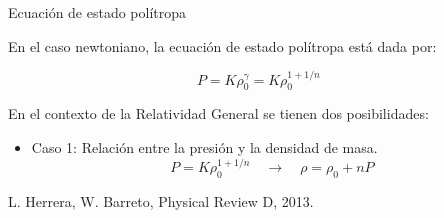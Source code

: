 \documentclass[handout,t]{beamer}
\begin{document}





    





    


\begin{frame}{Ecuación de estado polítropa}

\justifying

En el caso newtoniano, la ecuación de estado polítropa está dada por:    

\begin{equation*}
\label{Poli1}
    P = K \rho_{0}^{\gamma} = K \rho_{0}^{1+1/n} \, 
\end{equation*}    

\vspace{4mm}

En el contexto de la Relatividad General se tienen dos posibilidades:

\vspace{4mm}

\begin{itemize}
    \item Caso 1: Relación entre la presión y la densidad de masa.
    \begin{equation*}
        P = K \rho_{0}^{1+1/n} \quad   \longrightarrow \quad   \rho = \rho_{0} + n P
    \end{equation*}
\end{itemize}

\tiny \centering L. Herrera, W. Barreto, Physical Review D, 2013.

\end{frame}
\end{document}
